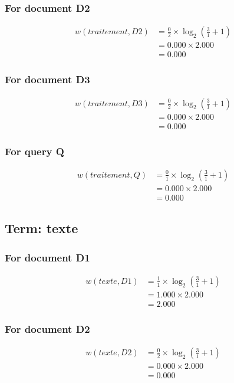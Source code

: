 \documentclass{article}
\begin{document}
\subsubsection*{For document D2}
\begin{align}
w(traitement, D2) &= \frac{0}{2} \times \log_{2}\left(\frac{3}{1} + 1\right) \\
&= 0.000 \times 2.000 \\
&= 0.000
\end{align}

\subsubsection*{For document D3}
\begin{align}
w(traitement, D3) &= \frac{0}{2} \times \log_{2}\left(\frac{3}{1} + 1\right) \\
&= 0.000 \times 2.000 \\
&= 0.000
\end{align}

\subsubsection*{For query Q}
\begin{align}
w(traitement, Q) &= \frac{0}{1} \times \log_{2}\left(\frac{3}{1} + 1\right) \\
&= 0.000 \times 2.000 \\
&= 0.000
\end{align}

\subsection{Term: texte}
\subsubsection*{For document D1}
\begin{align}
w(texte, D1) &= \frac{1}{1} \times \log_{2}\left(\frac{3}{1} + 1\right) \\
&= 1.000 \times 2.000 \\
&= 2.000
\end{align}

\subsubsection*{For document D2}
\begin{align}
w(texte, D2) &= \frac{0}{2} \times \log_{2}\left(\frac{3}{1} + 1\right) \\
&= 0.000 \times 2.000 \\
&= 0.000
\end{align}
\end{document}
